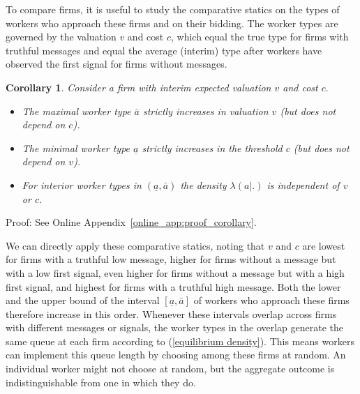 \documentclass[12pt]{article}
\newtheorem{corollary}[theorem]{Corollary}
\begin{document}
To compare firms, it is useful to study the comparative statics on the types of workers who approach these firms and on their bidding. The worker types are governed by the valuation $v$ and cost $c$, which equal the true type for firms with truthful messages and equal the average (interim) type after workers have observed the first signal for firms without messages.

\begin{corollary}
\label{corollary}Consider a firm with interim expected valuation $v$ and cost 
$c.$

\begin{itemize}
\item The maximal worker type $\bar{a}$ strictly increases in valuation $v$
(but does not depend on $c$).

\item The minimal worker type $\underline{a}$ strictly increases in the
threshold $c$ (but does not depend on $v$).

\item For interior worker types in $(\underline{a}, \bar{a})$ the density $\lambda (a|.)$ is independent of $v$ or $c$.
\end{itemize}
\end{corollary}

Proof: See Online Appendix~\ref{online_app:proof_corollary}.

We can directly apply these comparative statics, noting that $v$ and $c$ are lowest for firms with a truthful low message, higher for firms without a message but with a low first signal, even higher for firms without a message but with a high first signal, and highest for firms with a truthful high message. Both the lower and the upper bound of the interval $[\underline{a},\bar{a}]$ of workers who approach these firms therefore increase in this order. Whenever these intervals overlap across firms with different messages or signals, the worker types in the overlap generate the same queue at each firm according to (\ref{equilibrium density}). This means workers can implement this queue length by choosing among these firms at random. An individual worker might not choose at random, but the aggregate outcome is indistinguishable from one in which they do.
\end{document}
